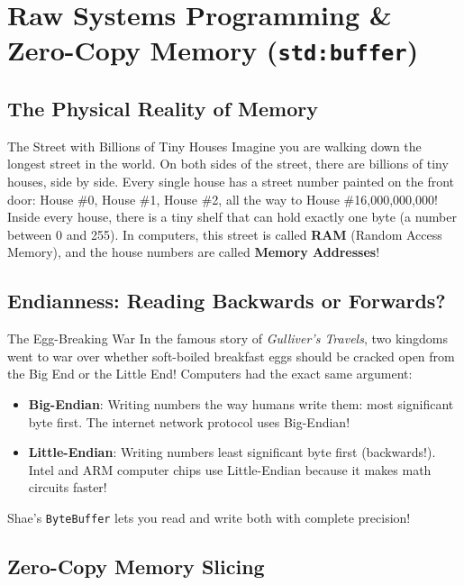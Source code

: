 \chapter{Raw Systems Programming \& Zero-Copy Memory (\texttt{std:buffer})}

\section{The Physical Reality of Memory}

\begin{kidbox}{The Street with Billions of Tiny Houses}
Imagine you are walking down the longest street in the world.
On both sides of the street, there are billions of tiny houses, side by side.
Every single house has a street number painted on the front door: House \#0, House \#1, House \#2, all the way to House \#16,000,000,000!
Inside every house, there is a tiny shelf that can hold exactly one byte (a number between 0 and 255).
In computers, this street is called \textbf{RAM} (Random Access Memory), and the house numbers are called \textbf{Memory Addresses}!
\end{kidbox}

\section{Endianness: Reading Backwards or Forwards?}

\begin{kidbox}{The Egg-Breaking War}
In the famous story of \textit{Gulliver's Travels}, two kingdoms went to war over whether soft-boiled breakfast eggs should be cracked open from the Big End or the Little End!
Computers had the exact same argument:
\begin{itemize}
    \item \textbf{Big-Endian}: Writing numbers the way humans write them: most significant byte first. The internet network protocol uses Big-Endian!
    \item \textbf{Little-Endian}: Writing numbers least significant byte first (backwards!). Intel and ARM computer chips use Little-Endian because it makes math circuits faster!
\end{itemize}
Shae's \texttt{ByteBuffer} lets you read and write both with complete precision!
\end{kidbox}

\section{Zero-Copy Memory Slicing}

